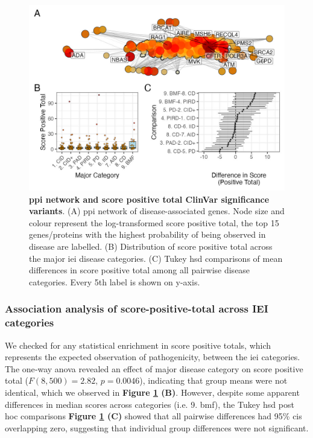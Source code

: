 \begin{figure}[ht]
  \centering
  \includegraphics[width=\textwidth]{../images/untangleR_ppi_network_assoc_patch1.jpg}
  \caption{\textbf{\ac{ppi} network and score positive total ClinVar significance variants}.
    (A) \ac{ppi} network of disease-associated genes. Node size and colour represent the log-transformed score positive total, the top 15 genes/proteins with the highest probability of being observed in disease are labelled.
    (B) Distribution of score positive total across the major \ac{iei} disease categories.
    (C) Tukey \ac{hsd} comparisons of mean differences in score positive total among all pairwise disease categories. Every 5th label is shown on y-axis.
  }
  \label{fig:ppi_network_assoc}
\end{figure}


\FloatBarrier
\subsubsection{Association analysis of score-positive-total across IEI categories} 

We checked for any statistical enrichment in score positive totals, which represents the expected observation of pathogenicity, between the \ac{iei} categories.
The one‐way \ac{anova} revealed an effect of major disease category on score positive total (\(F(8,500)=2.82,\,p=0.0046\)), indicating that group means were not identical, which we observed in
\textbf{Figure \ref{fig:ppi_network_assoc} (B)}.
However, despite some apparent differences in median scores across categories (i.e. 9. \ac{bmf}), the Tukey \ac{hsd} post hoc comparisons 
\textbf{Figure \ref{fig:ppi_network_assoc} (C)}
showed that all pairwise differences had 95\% \ac{ci}s overlapping zero, suggesting that individual group differences were not significant.


